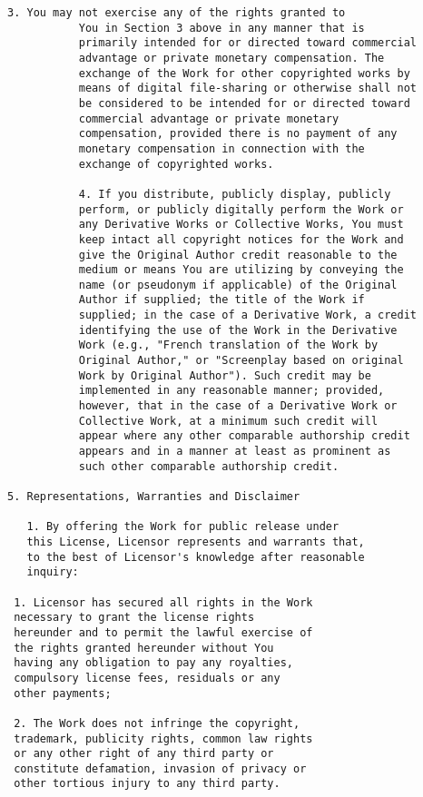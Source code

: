 \begin{Verbatim}[fontsize=\scriptsize]
           3. You may not exercise any of the rights granted to
           You in Section 3 above in any manner that is
           primarily intended for or directed toward commercial
           advantage or private monetary compensation. The
           exchange of the Work for other copyrighted works by
           means of digital file-sharing or otherwise shall not
           be considered to be intended for or directed toward
           commercial advantage or private monetary
           compensation, provided there is no payment of any
           monetary compensation in connection with the
           exchange of copyrighted works.
        
           4. If you distribute, publicly display, publicly
           perform, or publicly digitally perform the Work or
           any Derivative Works or Collective Works, You must
           keep intact all copyright notices for the Work and
           give the Original Author credit reasonable to the
           medium or means You are utilizing by conveying the
           name (or pseudonym if applicable) of the Original
           Author if supplied; the title of the Work if
           supplied; in the case of a Derivative Work, a credit
           identifying the use of the Work in the Derivative
           Work (e.g., "French translation of the Work by
           Original Author," or "Screenplay based on original
           Work by Original Author"). Such credit may be
           implemented in any reasonable manner; provided,
           however, that in the case of a Derivative Work or
           Collective Work, at a minimum such credit will
           appear where any other comparable authorship credit
           appears and in a manner at least as prominent as
           such other comparable authorship credit.

5. Representations, Warranties and Disclaimer

   1. By offering the Work for public release under
   this License, Licensor represents and warrants that,
   to the best of Licensor's knowledge after reasonable
   inquiry:

 1. Licensor has secured all rights in the Work
 necessary to grant the license rights
 hereunder and to permit the lawful exercise of
 the rights granted hereunder without You
 having any obligation to pay any royalties,
 compulsory license fees, residuals or any
 other payments;

 2. The Work does not infringe the copyright,
 trademark, publicity rights, common law rights
 or any other right of any third party or
 constitute defamation, invasion of privacy or
 other tortious injury to any third party.


\end{Verbatim}
